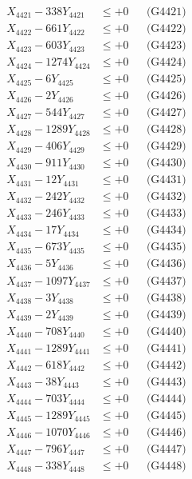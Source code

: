 \documentclass[a4paper,10pt]{article}
\begin{document}
{\begin{align}
\allowbreak
X_{4421} - 338Y_{4421} &\leq +0 && \text{(G4421)} \\
X_{4422} - 661Y_{4422} &\leq +0 && \text{(G4422)} \\
X_{4423} - 603Y_{4423} &\leq +0 && \text{(G4423)} \\
X_{4424} - 1274Y_{4424} &\leq +0 && \text{(G4424)} \\
X_{4425} - 6Y_{4425} &\leq +0 && \text{(G4425)} \\
X_{4426} - 2Y_{4426} &\leq +0 && \text{(G4426)} \\
X_{4427} - 544Y_{4427} &\leq +0 && \text{(G4427)} \\
X_{4428} - 1289Y_{4428} &\leq +0 && \text{(G4428)} \\
X_{4429} - 406Y_{4429} &\leq +0 && \text{(G4429)} \\
X_{4430} - 911Y_{4430} &\leq +0 && \text{(G4430)} \\
\allowbreak
X_{4431} - 12Y_{4431} &\leq +0 && \text{(G4431)} \\
X_{4432} - 242Y_{4432} &\leq +0 && \text{(G4432)} \\
X_{4433} - 246Y_{4433} &\leq +0 && \text{(G4433)} \\
X_{4434} - 17Y_{4434} &\leq +0 && \text{(G4434)} \\
X_{4435} - 673Y_{4435} &\leq +0 && \text{(G4435)} \\
X_{4436} - 5Y_{4436} &\leq +0 && \text{(G4436)} \\
X_{4437} - 1097Y_{4437} &\leq +0 && \text{(G4437)} \\
X_{4438} - 3Y_{4438} &\leq +0 && \text{(G4438)} \\
X_{4439} - 2Y_{4439} &\leq +0 && \text{(G4439)} \\
X_{4440} - 708Y_{4440} &\leq +0 && \text{(G4440)} \\
\allowbreak
X_{4441} - 1289Y_{4441} &\leq +0 && \text{(G4441)} \\
X_{4442} - 618Y_{4442} &\leq +0 && \text{(G4442)} \\
X_{4443} - 38Y_{4443} &\leq +0 && \text{(G4443)} \\
X_{4444} - 703Y_{4444} &\leq +0 && \text{(G4444)} \\
X_{4445} - 1289Y_{4445} &\leq +0 && \text{(G4445)} \\
X_{4446} - 1070Y_{4446} &\leq +0 && \text{(G4446)} \\
X_{4447} - 796Y_{4447} &\leq +0 && \text{(G4447)} \\
X_{4448} - 338Y_{4448} &\leq +0 && \text{(G4448)} \\

\end{align}}
\end{document}
